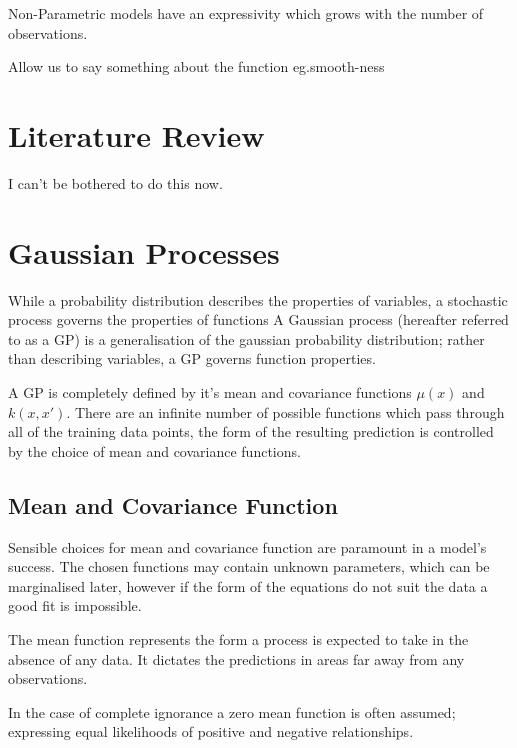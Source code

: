 \documentclass[a4paper,11pt]{report}
\begin{document}
Non-Parametric models have an expressivity which grows with the number of observations. 


Allow us to say something about the function eg.smooth-ness

\chapter{Literature Review}
I can't be bothered to do this now.

\chapter{Gaussian Processes}

While a probability distribution describes the properties of variables, a stochastic process governs the properties of functions A Gaussian process (hereafter referred to as a GP) is a generalisation of the gaussian probability distribution; rather than describing variables, a GP governs function properties. \par

A GP is completely defined by it's mean and covariance functions \(\mu (x)\) and \( k(x,x')\). There are an infinite number of possible functions which pass through all of the training data points, the form of the resulting prediction is controlled by the choice of mean and covariance functions.

\section{Mean and Covariance Function}

Sensible choices for mean and covariance function are paramount in a model's success. The chosen functions may contain unknown parameters, which can be marginalised later, however if the form of the equations do not suit the data a good fit is impossible. \\ \par

The mean function represents the form a process is expected to take in the absence of any data. It dictates the predictions in areas far away from any observations.

In the case of complete ignorance a zero mean function is often assumed; expressing equal likelihoods of positive and negative relationships. 
\end{document}
